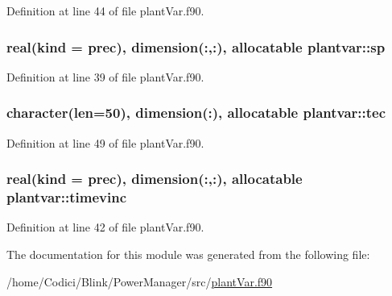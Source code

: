 Definition at line 44 of file plant\-Var.\-f90.

\hypertarget{classplantvar_a0ecfac9070622328232608ce808ede2b}{
\subsubsection[{sp}]{\setlength{\rightskip}{0pt plus 5cm}real(kind = prec), dimension(\-:,\-:), allocatable plantvar\-::sp}}\label{classplantvar_a0ecfac9070622328232608ce808ede2b}


Definition at line 39 of file plant\-Var.\-f90.

\hypertarget{classplantvar_a4de39d7f2e55534eeac1a570bf8d30ff}{
\subsubsection[{tec}]{\setlength{\rightskip}{0pt plus 5cm}character(len=50), dimension(\-:), allocatable plantvar\-::tec}}\label{classplantvar_a4de39d7f2e55534eeac1a570bf8d30ff}


Definition at line 49 of file plant\-Var.\-f90.

\hypertarget{classplantvar_aade5aa28513690acf2cf215b0dc1acd2}{
\subsubsection[{timevinc}]{\setlength{\rightskip}{0pt plus 5cm}real(kind = prec), dimension(\-:,\-:), allocatable plantvar\-::timevinc}}\label{classplantvar_aade5aa28513690acf2cf215b0dc1acd2}


Definition at line 42 of file plant\-Var.\-f90.



The documentation for this module was generated from the following file\-:\begin{DoxyCompactItemize}
\item 
/home/\-Codici/\-Blink/\-Power\-Manager/src/\hyperlink{plant_var_8f90}{plant\-Var.\-f90}\end{DoxyCompactItemize}
